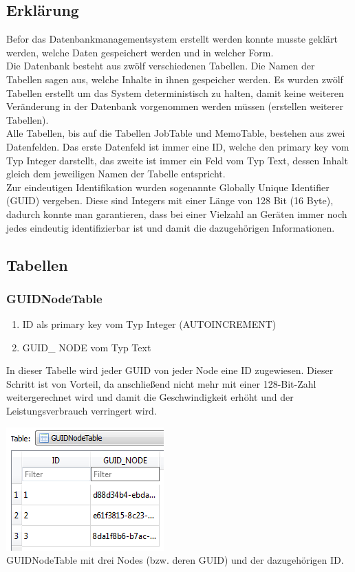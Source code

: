 \documentclass[12pt,a4paper]{report}
\begin{document}
\begin{onehalfspace}
\subsection{Erklärung}
Befor das Datenbankmanagementsystem erstellt werden konnte musste geklärt werden, welche Daten gespeichert werden und in welcher Form.\\

Die Datenbank besteht aus zwölf verschiedenen Tabellen. Die Namen der Tabellen sagen aus, welche Inhalte in ihnen gespeicher werden. Es wurden zwölf Tabellen erstellt um das System deterministisch zu halten, damit keine weiteren Veränderung in der Datenbank vorgenommen werden müssen (erstellen weiterer Tabellen).\\

Alle Tabellen, bis auf die Tabellen JobTable und MemoTable, bestehen aus zwei Datenfelden. Das erste Datenfeld ist immer eine ID, welche den primary key vom Typ Integer darstellt, das zweite ist immer ein Feld vom Typ Text, dessen Inhalt gleich dem jeweiligen Namen der Tabelle entspricht.\\

Zur eindeutigen Identifikation wurden sogenannte Globally Unique Identifier (GUID) vergeben. Diese sind Integers mit einer Länge von 128 Bit (16 Byte), dadurch konnte man garantieren, dass bei einer Vielzahl an Geräten immer noch jedes eindeutig identifizierbar ist und damit die dazugehörigen Informationen.
\subsection{Tabellen}
\subsubsection{GUIDNodeTable}
\begin{enumerate}
\item ID als primary key vom Typ Integer (AUTOINCREMENT)
\item GUID\_ NODE vom Typ Text
\end{enumerate}
In dieser Tabelle wird jeder GUID von jeder Node eine ID zugewiesen. Dieser Schritt ist von Vorteil, da anschließend nicht mehr mit einer 128-Bit-Zahl weitergerechnet wird und damit die Geschwindigkeit erhöht und der Leistungsverbrauch verringert wird.
\begin{center}
\includegraphics[scale=0.8]{img/db-tb-guid-node.png}\\
GUIDNodeTable mit drei Nodes (bzw. deren GUID) und der dazugehörigen ID.
\end{center}

\end{onehalfspace}
\end{document}
